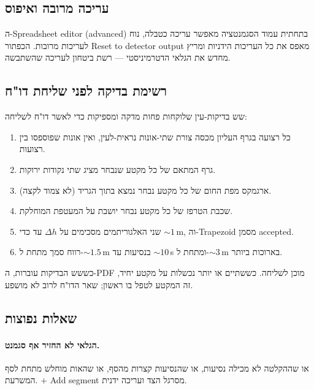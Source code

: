 \documentclass[11pt,a4paper]{article}
\begin{document}
\subsection{עריכה מרובה ואיפוס}

ה-\textenglish{Spreadsheet editor (advanced)} בתחתית עמוד
הסגמנטציה מאפשר עריכה כטבלה, נוח לעריכות מרובות. הכפתור
\textenglish{Reset to detector output} מאפס את כל העריכות
הידניות ומריץ מחדש את הגלאי הדטרמיניסטי --- רשת ביטחון לעריכה
שהשתבשה.

\subsection{רשימת בדיקה לפני שליחת דו"ח}

שש בדיקות-עין שלוקחות פחות מדקה ומספיקות כדי לאשר דו"ח לשליחה:

\begin{enumerate}
  \item כל רצועה בגרף העליון מכסה צורת שתי-אונות נראית-לעין, ואין
    אונות שפוספסו בין רצועות.
  \item גרף המתאם של כל מקטע שנבחר מציג שתי נקודות ירוקות.
  \item ארגמקס מפת החום של כל מקטע נבחר נמצא בתוך הגריד (לא
    צמוד לקצה).
  \item שכבת הטרפז של כל מקטע נבחר יושבת על המעטפת המוחלקת.
  \item שני האלגוריתמים מסכימים על $\Delta h$ עד כדי
    $\sim 1$\,\textenglish{m}, וה-\textenglish{Trapezoid} מסמן
    \textenglish{accepted}.
  \item רווח סמך מתחת ל-$\sim 1.5$\,\textenglish{m} בנסיעות עד
    $\sim 10$\,\textenglish{s} ומתחת ל-$\sim 3$\,\textenglish{m}
    בארוכות ביותר.
\end{enumerate}

כששש הבדיקות עוברות, ה-\textenglish{PDF} מוכן לשליחה. כששתיים
או יותר נכשלות על מקטע יחיד, זה המקטע לטפל בו ראשון; שאר הדו"ח
לרוב לא מושפע.

\subsection{שאלות נפוצות}

\paragraph{הגלאי לא החזיר אף סגמנט.}
או שההקלטה לא מכילה נסיעות, או שהנסיעות קצרות מהסף, או שהאות
מוחלש מתחת לסף המשרעת. \textenglish{$+$ Add segment} מסרגל הצד
ועריכה ידנית.
\end{document}
